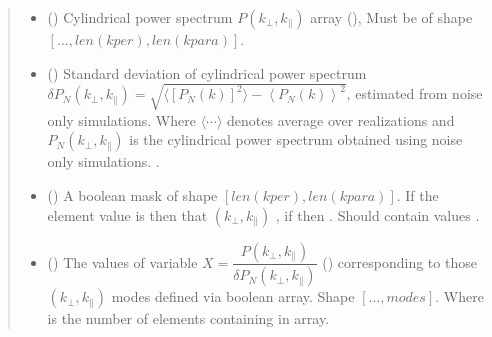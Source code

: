 \documentclass[a4paper,11pt,oneside,english,openany]{sphinxmanual}
\begin{document}
\begin{fulllineitems}
\label{\detokenize{psestimation:psestimation.X}}
\pysigstartsignatures
{}
\pysigstopsignatures\begin{quote}\begin{description}
\begin{itemize}
\item {} 
\sphinxAtStartPar
{} () \textendash{} Cylindrical power spectrum \(P(k_{\perp},k_{\parallel})\) array (), Must be of shape \([\dots,len(kper),len(kpara)]\).

\item {} 
\sphinxAtStartPar
{} () \textendash{} Standard deviation of cylindrical power spectrum \(\delta P_N(k_{\perp},k_{\parallel}) = \sqrt{\langle\left[ P_N(k)\right]^2\rangle - \left\langle P_N(k) \right\rangle^2}\), estimated from noise only simulations. Where \(\langle\cdots\rangle\) denotes average over realizations and \(P_N(k_{\perp},k_{\parallel})\) is the cylindrical power spectrum obtained using noise only simulations.  .

\item {} 
\sphinxAtStartPar
{} () \textendash{} A  boolean mask of shape \([len(kper),len(kpara)]\). If the element value is  then that \((k_{\perp},k_{\parallel})\) , if  then . Should contain values .

\end{itemize}

\sphinxAtStartPar
\begin{itemize}
\item {} 
\sphinxAtStartPar
{} () \textendash{} The values of variable \(X = \dfrac{P(k_{\perp},k_{\parallel})}{\delta P_N(k_{\perp},k_{\parallel})}\) () corresponding to those \((k_{\perp},k_{\parallel})\) modes defined via  boolean array. Shape \([\dots,modes]\). Where  is the number of elements containing  in  array.


\end{itemize}
\end{description}
\end{quote}
\end{fulllineitems}
\end{document}
